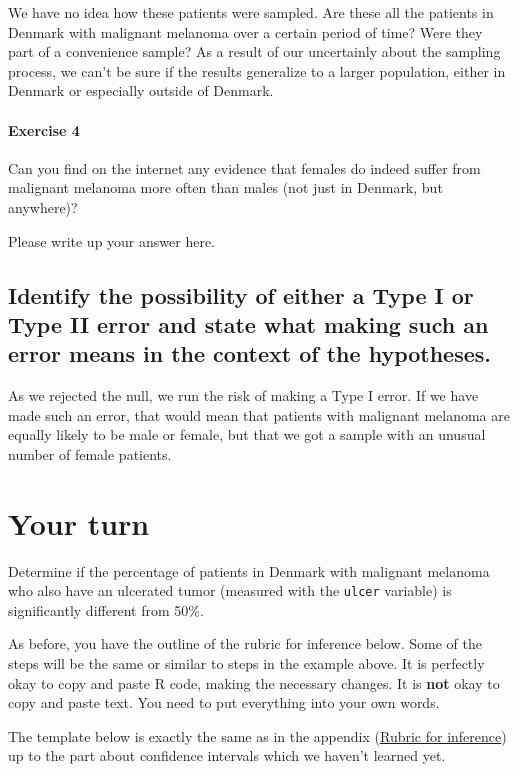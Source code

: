 \documentclass[
]{book}
\begin{document}
We have no idea how these patients were sampled. Are these all the patients in Denmark with malignant melanoma over a certain period of time? Were they part of a convenience sample? As a result of our uncertainly about the sampling process, we can't be sure if the results generalize to a larger population, either in Denmark or especially outside of Denmark.

\hypertarget{exercise-4-6}{%
\paragraph*{Exercise 4}\label{exercise-4-6}}

Can you find on the internet any evidence that females do indeed suffer from malignant melanoma more often than males (not just in Denmark, but anywhere)?

Please write up your answer here.

\hypertarget{hypothesis2-ex-errors}{%
\subsection{Identify the possibility of either a Type I or Type II error and state what making such an error means in the context of the hypotheses.}\label{hypothesis2-ex-errors}}

As we rejected the null, we run the risk of making a Type I error. If we have made such an error, that would mean that patients with malignant melanoma are equally likely to be male or female, but that we got a sample with an unusual number of female patients.

\hypertarget{hypothesis2-your-turn}{%
\section{Your turn}\label{hypothesis2-your-turn}}

Determine if the percentage of patients in Denmark with malignant melanoma who also have an ulcerated tumor (measured with the \texttt{ulcer} variable) is significantly different from 50\%.

As before, you have the outline of the rubric for inference below. Some of the steps will be the same or similar to steps in the example above. It is perfectly okay to copy and paste R code, making the necessary changes. It is \textbf{not} okay to copy and paste text. You need to put everything into your own words.

The template below is exactly the same as in the appendix (\protect\hyperlink{appendix-rubric}{Rubric for inference}) up to the part about confidence intervals which we haven't learned yet.
\end{document}
